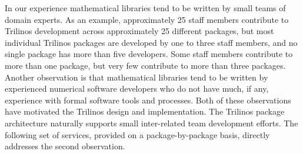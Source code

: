 \documentclass[acmtoms,acmnow]{acmtrans2m}
\begin{document}
In our experience mathematical libraries tend to be written by small
teams of domain experts.  As an example, approximately 25 staff
members contribute to Trilinos development across approximately 25
different packages, but most individual Trilinos packages
are developed by one to three staff members, and no single package has more than five
developers.   Some staff members contribute to more than one package,
but very few contribute to more than three packages.  Another
observation is that mathematical libraries tend to be written
by experienced numerical software
developers who do not have much, if any, experience with formal
software tools and processes.  Both of these observations have
motivated the Trilinos design and implementation.  The Trilinos
package architecture naturally supports small inter-related team
development efforts.  The following set of services, provided on a
package-by-package basis, directly addresses the second observation.
\end{document}
